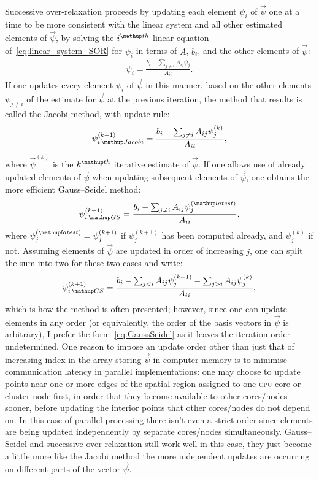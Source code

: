 Successive over-relaxation proceeds by updating each element $\psi_i$ of $\vec\psi$ one at a time to be more consistent with the linear system and all other estimated elements of $\vec\psi$, by solving the $i^\up{th}$ linear equation of~\eqref{eq:linear_system_SOR} for $\psi_i$ in terms of $A$, $b_i$, and the other elements of $\vec\psi$:
\begin{align}
\psi_i = \frac{b_i - \sum_{j\neq i} A_{ij}\psi_j}{A_{ii}}.
\end{align}
If one updates every element $\psi_i$ of $\vec\psi$ in this manner, based on the other elements $\psi_{j\neq i}$ of the estimate for $\vec\psi$ at the previous iteration, the method that results is called the Jacobi method, with update rule:
\begin{align}
\psi^{(k+1)}_{i\,\up{Jacobi}} = \frac{b_i - \sum_{j\neq i} A_{ij}\psi^{(k)}_j}{A_{ii}},
\end{align}
where $\vec\psi^{(k)}$ is the $k^\up{th}$ iterative estimate of $\vec\psi$.
If one allows use of already updated elements of $\vec\psi$ when updating subsequent elements of $\vec\psi$, one obtains the more efficient Gauss--Seidel method:
\begin{align}\label{eq:GaussSeidel}
\psi^{(k+1)}_{i\,\up{GS}} = \frac{b_i - \sum_{j\neq i} A_{ij}\psi^{(\up{latest})}_j}{A_{ii}},
\end{align}
where $\psi^{(\up{latest})}_j = \psi^{(k+1)}_j$ if $\psi^{(k+1)}_j$ has been computed already, and $\psi^{(k)}_j$ if not. Assuming elements of $\vec\psi$ are updated in order of increasing $j$, one can split the sum into two for these two cases and write:
\begin{align}
\psi^{(k+1)}_{i\,\up{GS}} = \frac{b_i - \sum_{j<i} A_{ij}\psi^{(k+1)}_j - \sum_{j>i} A_{ij}\psi^{(k)}_j}{A_{ii}},
\end{align}
which is how the method is often presented; however, since one can update elements in any order (or equivalently, the order of the basis vectors in $\vec\psi$ is arbitrary), I prefer the form~\eqref{eq:GaussSeidel} as it leaves the iteration order undetermined. One reason to impose an update order other than just that of increasing index in the array storing $\vec\psi$ in computer memory is to minimise communication latency in parallel implementations: one may choose to update points near one or more edges of the spatial region assigned to one \textsc{cpu} core or cluster node first, in order that they become available to other cores/nodes sooner, before updating the interior points that other cores/nodes do not depend on. In this case of parallel processing there isn't even a strict order since elements are being updated independently by separate cores/nodes simultaneously. Gauss--Seidel and successive over-relaxation still work well in this case, they just become a little more like the Jacobi method the more independent updates are occurring on different parts of the vector $\vec\psi$.

